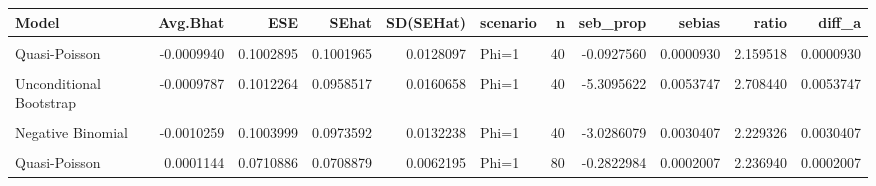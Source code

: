 \documentclass[border=1mm]{standalone}
\begin{document}
\begin{table}
\centering
\begin{tabular}{l|r|r|r|r|l|r|r|r|r|r}
\hline
Model & Avg.Bhat & ESE & SEhat & SD(SEHat) & scenario & n & seb\_prop & sebias & ratio & diff\_a\\
\hline
\cellcolor{gray!10}{Poisson} & \cellcolor{gray!10}{-0.0009940} & \cellcolor{gray!10}{0.1002895} & \cellcolor{gray!10}{0.1008992} & \cellcolor{gray!10}{0.0059317} & \cellcolor{gray!10}{Phi=1} & \cellcolor{gray!10}{40} & \cellcolor{gray!10}{0.6079859} & \cellcolor{gray!10}{-0.0006097} & \cellcolor{gray!10}{1.000000} & \cellcolor{gray!10}{0.0006097}\\
\hline
Quasi-Poisson & -0.0009940 & 0.1002895 & 0.1001965 & 0.0128097 & Phi=1 & 40 & -0.0927560 & 0.0000930 & 2.159518 & 0.0000930\\
\hline
\cellcolor{gray!10}{Sandwich} & \cellcolor{gray!10}{-0.0009940} & \cellcolor{gray!10}{0.1002895} & \cellcolor{gray!10}{0.0960385} & \cellcolor{gray!10}{0.0151834} & \cellcolor{gray!10}{Phi=1} & \cellcolor{gray!10}{40} & \cellcolor{gray!10}{-4.2387330} & \cellcolor{gray!10}{0.0042510} & \cellcolor{gray!10}{2.559688} & \cellcolor{gray!10}{0.0042510}\\
\hline
Unconditional Bootstrap & -0.0009787 & 0.1012264 & 0.0958517 & 0.0160658 & Phi=1 & 40 & -5.3095622 & 0.0053747 & 2.708440 & 0.0053747\\
\hline
\cellcolor{gray!10}{Conditional Bootstrap} & \cellcolor{gray!10}{-0.0008175} & \cellcolor{gray!10}{0.1012263} & \cellcolor{gray!10}{0.0958517} & \cellcolor{gray!10}{0.0160658} & \cellcolor{gray!10}{Phi=1} & \cellcolor{gray!10}{40} & \cellcolor{gray!10}{-5.3094261} & \cellcolor{gray!10}{0.0053745} & \cellcolor{gray!10}{2.708440} & \cellcolor{gray!10}{0.0053745}\\
\hline
Negative Binomial & -0.0010259 & 0.1003999 & 0.0973592 & 0.0132238 & Phi=1 & 40 & -3.0286079 & 0.0030407 & 2.229326 & 0.0030407\\
\hline
\cellcolor{gray!10}{Poisson} & \cellcolor{gray!10}{0.0001144} & \cellcolor{gray!10}{0.0710886} & \cellcolor{gray!10}{0.0710773} & \cellcolor{gray!10}{0.0027804} & \cellcolor{gray!10}{Phi=1} & \cellcolor{gray!10}{80} & \cellcolor{gray!10}{-0.0158021} & \cellcolor{gray!10}{0.0000112} & \cellcolor{gray!10}{1.000000} & \cellcolor{gray!10}{0.0000112}\\
\hline
Quasi-Poisson & 0.0001144 & 0.0710886 & 0.0708879 & 0.0062195 & Phi=1 & 80 & -0.2822984 & 0.0002007 & 2.236940 & 0.0002007\\

\end{tabular}
\end{table}
\end{document}
